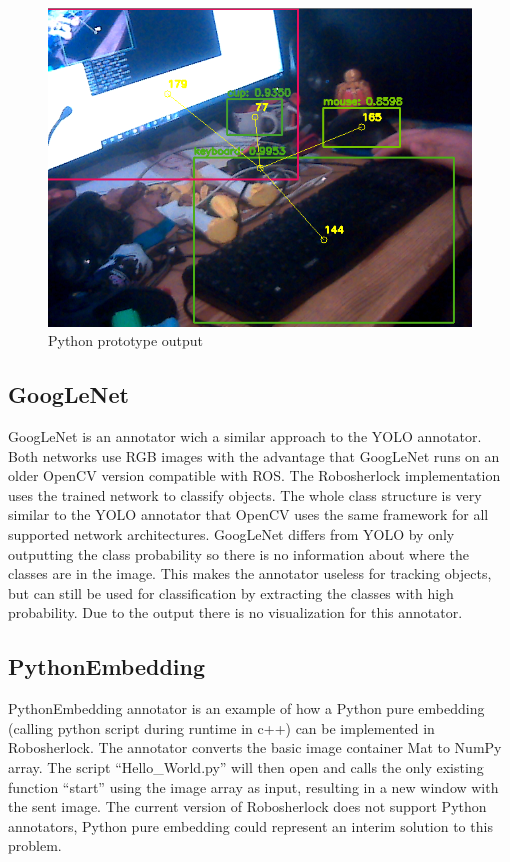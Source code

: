 \documentclass[main.tex]{subfiles}
\begin{document}
\begin{figure}[H]
\centering
\includegraphics[width=1\textwidth]{pictures/perception/YOLO.png}
\caption{Python prototype output}
\end{figure}

				\subsection{GoogLeNet}
GoogLeNet is an annotator wich a similar approach to the YOLO annotator. Both networks use RGB images with the advantage that GoogLeNet runs on an older OpenCV version compatible with ROS.
The Robosherlock implementation uses the trained network to classify objects. The whole class structure is very similar to the YOLO annotator that OpenCV uses the same framework for all supported network architectures.
GoogLeNet differs from YOLO by only outputting the class probability so there is no information about where the classes are in the image. This makes the annotator useless for tracking objects, but can still be used for classification by extracting the classes with high probability.
Due to the output there is no visualization for this annotator.

				\subsection{PythonEmbedding}
PythonEmbedding annotator is an example of how a Python pure embedding (calling python script during runtime in c++) can be implemented in Robosherlock. The annotator converts the basic image container Mat to NumPy array. The script “Hello\_World.py” will then open and calls the only existing function “start”  using the image array as input, resulting in a new window with the sent image.
The current version of Robosherlock does not support Python annotators, Python pure embedding could represent an interim solution to this problem.

\endgroup
\end{document}
